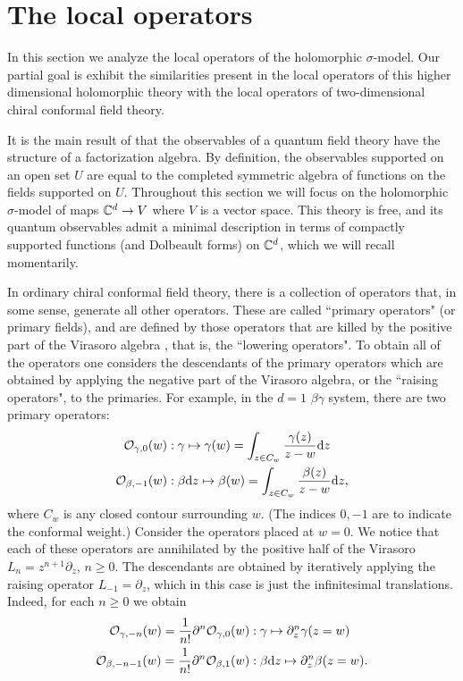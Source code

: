 %


\section{The local operators}

In this section we analyze the local operators of the holomorphic $\sigma$-model. 
Our partial goal is exhibit the similarities present in the local operators of this higher dimensional holomorphic theory with the local operators of two-dimensional chiral conformal field theory.

It is the main result of \cite{CG2} that the observables of a quantum field theory have the structure of a factorization algebra.
By definition, the observables supported on an open set $U$ are equal to the completed symmetric algebra of functions on the fields supported on $U$. 
Throughout this section we will focus on the holomorphic $\sigma$-model of maps $\mathbb C^d \to V$ where $V$ is a vector space.
This theory is free, and its quantum observables admit a minimal description in terms of compactly supported functions (and Dolbeault forms) on $\mathbb C^d$, which we will recall momentarily.

In ordinary chiral conformal field theory, there is a collection of operators that, in some sense, generate all other operators. 
These are called ``primary operators" (or primary fields), and are defined by those operators that are killed by the positive part of the Virasoro algebra \cite{polchinski}, that is, the ``lowering operators". 
To obtain all of the operators one considers the descendants of the primary operators which are obtained by applying the negative part of the Virasoro algebra, or the ``raising operators", to the primaries. 
For example, in the $d=1$ $\beta\gamma$ system, there are two primary operators:
\begin{align*}
\mathcal O_{\gamma,0} (w) & : \gamma \mapsto \gamma(w) = \int_{z \in C_w} \frac{\gamma(z)}{z-w} {\rm d} z  \\
\mathcal O_{\beta,-1} (w) & : \beta {\rm d} z \mapsto \beta(w) = \int_{z \in C_w} \frac{\beta(z)}{z-w} {\rm d} z ,
\end{align*}
where $C_w$ is any closed contour surrounding $w$. 
(The indices $0,-1$ are to indicate the conformal weight.)
Consider the operators placed at $w=0$.
We notice that each of these operators are annihilated by the positive half of the Virasoro $L_n = z^{n+1} \partial_z$, $n \geq 0$.
The descendants are obtained by iteratively applying the raising operator $L_{-1} = \partial_z$, which in this case is just the infinitesimal translations. 
Indeed, for each $n \geq 0$ we obtain
\begin{align*}
\mathcal O_{\gamma,-n}(w) = \frac{1}{n!} \partial^n \mathcal O_{\gamma,0}(w) & : \gamma \mapsto \partial_z^n \gamma(z = w) \\
\mathcal O_{\beta,-n-1}(w) = \frac{1}{n!} \partial^n \mathcal O_{\beta,1}(w) & : \beta {\rm d} z \mapsto \partial_z^n \beta(z=w) .
\end{align*}

